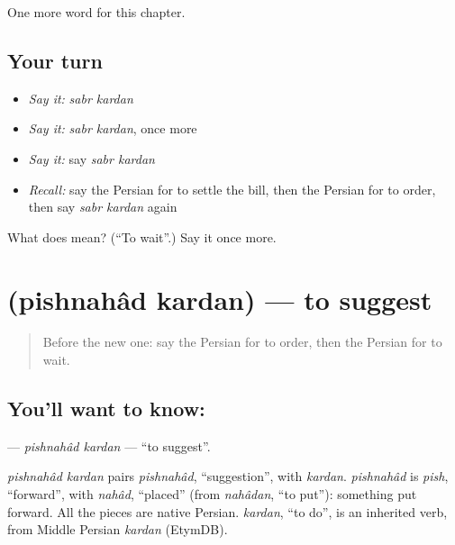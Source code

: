 \begin{grammarlens}[title={What you've built}]
One more word for this chapter.
\end{grammarlens}

\subsection*{Your turn}
\begin{itemize}
\raggedright
  \item \emph{Say it:} \emph{sabr kardan}
  \item \emph{Say it:} \emph{sabr kardan}, once more
  \item \emph{Say it:} say \emph{sabr kardan}
  \item \emph{Recall:} say the Persian for to settle the bill, then the Persian for to order, then say \emph{sabr kardan} again
\end{itemize}

\begin{tcolorbox}[breakable,colback=teal!4,colframe=teal!35!black,title={Before you move on}]
What does   mean? (\textquotedblleft{}To wait\textquotedblright{}.) Say it once more.
\end{tcolorbox}
\section[\texorpdfstring{\fa{پیشنهاد} \fa{کردن} (pishnahâd kardan)}{پیشنهاد کردن (pishnahâd kardan)}]{  (pishnahâd kardan) — to suggest}

\label{lesson:FA-C142-pishnahad-kardan}



\begin{quote}
Before the new one: say the Persian for to order, then the Persian for to wait.
\end{quote}

\subsection*{You'll want to know:  }
\textbf{ } — \emph{pishnahâd kardan} — \textquotedblleft{}to suggest\textquotedblright{}.

\begin{cousinweb}
\emph{pishnahâd kardan} pairs \emph{pishnahâd}, \textquotedblleft{}suggestion\textquotedblright{}, with \emph{kardan}. \emph{pishnahâd} is \emph{pish}, \textquotedblleft{}forward\textquotedblright{}, with \emph{nahâd}, \textquotedblleft{}placed\textquotedblright{} (from \emph{nahâdan}, \textquotedblleft{}to put\textquotedblright{}): something put forward. All the pieces are native Persian. \emph{kardan}, \textquotedblleft{}to do\textquotedblright{}, is an inherited verb, from Middle Persian \emph{kardan} (EtymDB).
\end{cousinweb}

